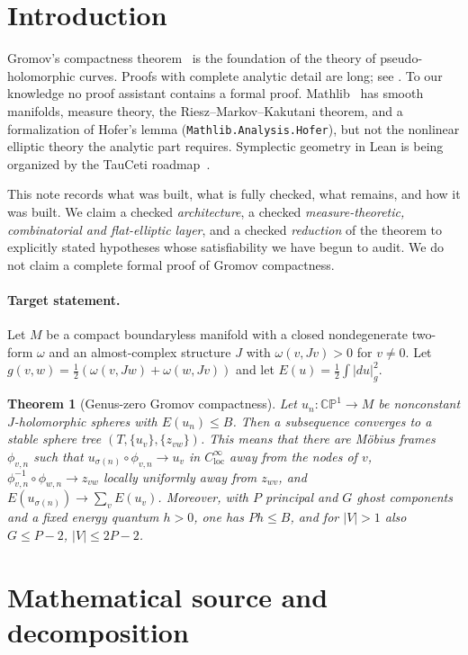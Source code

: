 \documentclass[11pt]{article}
\renewcommand{\_}{\origus\allowbreak}
\newtheorem{theorem}{Theorem}
\newcommand{\CP}{\mathbb{CP}^1}
\newcommand{\code}[1]{\texttt{#1}}
\begin{document}
\section{Introduction}

Gromov's compactness theorem~\cite{Gromov85} is the foundation of the theory of
pseudo-holomorphic curves. Proofs with complete analytic detail are long; see
\cite{McDuffSalamon,Zinger,IvashkovichShevchishin}. To our knowledge no proof assistant
contains a formal proof. Mathlib~\cite{mathlib} has smooth manifolds, measure theory, the
Riesz--Markov--Kakutani theorem, and a formalization of Hofer's lemma
(\code{Mathlib.Analysis.Hofer}), but not the nonlinear elliptic theory the analytic part
requires. Symplectic geometry in Lean is being organized by the TauCeti roadmap~\cite{TauCeti}.

This note records what was built, what is fully checked, what remains, and how it was built. We
claim a checked \emph{architecture}, a checked \emph{measure-theoretic, combinatorial and
flat-elliptic layer}, and a checked \emph{reduction} of the theorem to explicitly stated
hypotheses whose satisfiability we have begun to audit. We do not claim a complete formal proof of
Gromov compactness.

\paragraph{Target statement.}
Let $M$ be a compact boundaryless manifold with a closed nondegenerate two-form $\omega$ and an
almost-complex structure $J$ with $\omega(v,Jv)>0$ for $v\ne0$. Let
$g(v,w)=\tfrac12(\omega(v,Jw)+\omega(w,Jv))$ and let $E(u)=\tfrac12\int|du|_g^2$.

\begin{theorem}[Genus-zero Gromov compactness]\label{thm:main}
Let $u_n:\CP\to M$ be nonconstant $J$-holomorphic spheres with $E(u_n)\le B$. Then a subsequence
converges to a stable sphere tree $(T,\{u_v\},\{z_{vw}\})$. This means that there are M\"obius
frames $\phi_{v,n}$ such that $u_{\sigma(n)}\circ\phi_{v,n}\to u_v$ in $C^\infty_{\mathrm{loc}}$
away from the nodes of $v$, $\phi_{v,n}^{-1}\circ\phi_{w,n}\to z_{vw}$ locally uniformly away from
$z_{wv}$, and $E(u_{\sigma(n)})\to\sum_v E(u_v)$. Moreover, with $P$ principal and $G$ ghost
components and a fixed energy quantum $h>0$, one has $Ph\le B$, and for $|V|>1$ also $G\le P-2$,
$|V|\le 2P-2$.
\end{theorem}

\section{Mathematical source and decomposition}
\end{document}
